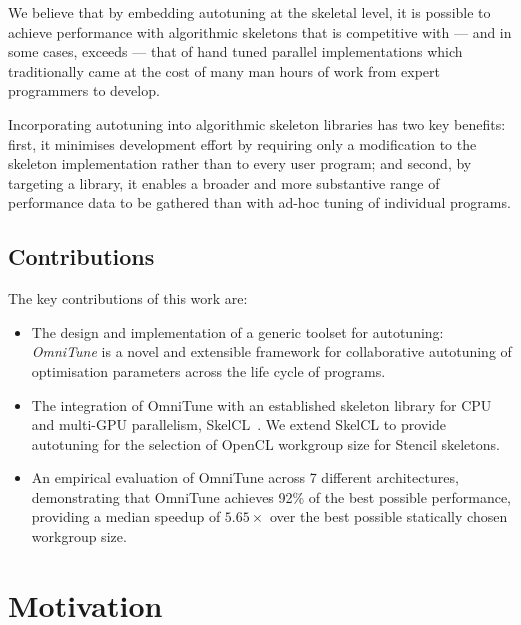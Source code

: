\documentclass[nonatbib,preprint,9pt]{sigplanconf}
\begin{document}
We believe that by embedding autotuning at the skeletal level, it is
possible to achieve performance with algorithmic skeletons that is
competitive with --- and in some cases, exceeds --- that of hand tuned
parallel implementations which traditionally came at the cost of many
man hours of work from expert programmers to develop.

Incorporating autotuning into algorithmic skeleton libraries has two
key benefits: first, it minimises development effort by requiring only
a modification to the skeleton implementation rather than to every
user program; and second, by targeting a library, it enables a broader
and more substantive range of performance data to be gathered than
with ad-hoc tuning of individual programs.


\subsection{Contributions}

The key contributions of this work are:

\begin{itemize}
\item The design and implementation of a generic toolset for
  autotuning: \emph{OmniTune} is a novel and extensible framework for
  collaborative autotuning of optimisation parameters across the life
  cycle of programs.
\item The integration of OmniTune with an established skeleton library
  for CPU and multi-GPU parallelism, SkelCL~\cite{Steuwer2011}. We
  extend SkelCL to provide autotuning for the selection of OpenCL
  workgroup size for Stencil skeletons.
\item An empirical evaluation of OmniTune across 7 different
  architectures, demonstrating that OmniTune achieves 92\% of the best
  possible performance, providing a median speedup of $5.65\times$
  over the best possible statically chosen workgroup size.
\end{itemize}

\section{Motivation}
\end{document}
